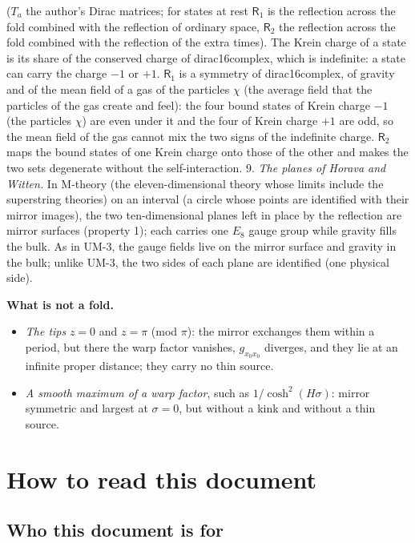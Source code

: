 \documentclass[
  10pt,
]{article}
\providecommand{\tightlist}{%
  \setlength{\itemsep}{0pt}\setlength{\parskip}{0pt}}
\begin{document}
(\(T_a\) the author's Dirac matrices; for states at rest
\(\mathsf{R}_1\) is the reflection across the fold combined with the
reflection of ordinary space, \(\mathsf{R}_2\) the reflection across the
fold combined with the reflection of the extra times). The Krein charge
of a state is its share of the conserved charge of dirac16complex, which
is indefinite: a state can carry the charge \(-1\) or \(+1\).
\(\mathsf{R}_1\) is a symmetry of dirac16complex, of gravity and of the
mean field of a gas of the particles \(\chi\) (the average field that
the particles of the gas create and feel): the four bound states of
Krein charge \(-1\) (the particles \(\chi\)) are even under it and the
four of Krein charge \(+1\) are odd, so the mean field of the gas cannot
mix the two signs of the indefinite charge. \(\mathsf{R}_2\) maps the
bound states of one Krein charge onto those of the other and makes the
two sets degenerate without the self-interaction. 9. \emph{The planes of
Horava and Witten.} In M-theory (the eleven-dimensional theory whose
limits include the superstring theories) on an interval (a circle whose
points are identified with their mirror images), the two ten-dimensional
planes left in place by the reflection are mirror surfaces (property 1);
each carries one \(E_8\) gauge group while gravity fills the bulk. As in
UM-3, the gauge fields live on the mirror surface and gravity in the
bulk; unlike UM-3, the two sides of each plane are identified (one
physical side).

\textbf{What is not a fold.}

\begin{itemize}
\tightlist
\item
  \emph{The tips} \(z = 0\) and \(z = \pi\) (mod \(\pi\)): the mirror
  exchanges them within a period, but there the warp factor vanishes,
  \(g_{x_0x_0}\) diverges, and they lie at an infinite proper distance;
  they carry no thin source.
\item
  \emph{A smooth maximum of a warp factor}, such as
  \(1/\cosh^2(H\sigma)\): mirror symmetric and largest at
  \(\sigma = 0\), but without a kink and without a thin source.
\end{itemize}

\hypertarget{how-to-read-this-document}{%
\section{How to read this document}\label{how-to-read-this-document}}

\hypertarget{who-this-document-is-for}{%
\subsection{Who this document is for}\label{who-this-document-is-for}}
\end{document}
